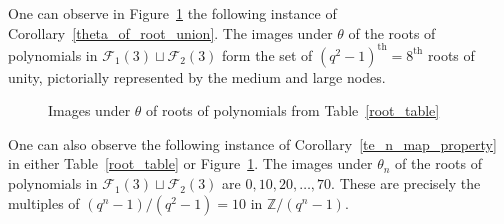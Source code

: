 \documentclass[Unicode,ALCO]{cedram}
\newcommand{\CF}{\mathcal{F}}
\newcommand{\Z}{\mathbb{Z}}
\newcommand{\te}{\theta}
\begin{document}
\begin{example}
One can observe in Figure~\ref{root_picture} the following instance of Corollary~\ref{theta_of_root_union}.
The images under \(\te\) of the roots of polynomials in \(\CF_1 (3) \sqcup \CF_2 (3)\) form the set of \((q^2-1)^\text{th} = 8^\text{th}\) roots of unity, pictorially represented by the medium and large nodes.

\begin{figure}
\caption{Images under \(\te\) of roots of polynomials from Table~\ref{root_table}}
\centering
{}
\label{root_picture}
\end{figure}

One can also observe the following instance of Corollary~\ref{te_n_map_property} in either Table~\ref{root_table} or Figure~\ref{root_picture}.
The images under \(\te_n\) of the roots of polynomials in \(\CF_1 (3) \sqcup \CF_2 (3)\) are \(0, 10, 20, \ldots, 70\).
These are precisely the multiples of \((q^n-1)/(q^2-1) = 10\) in \(\Z / (q^n-1)\).
\end{example}
\end{document}
